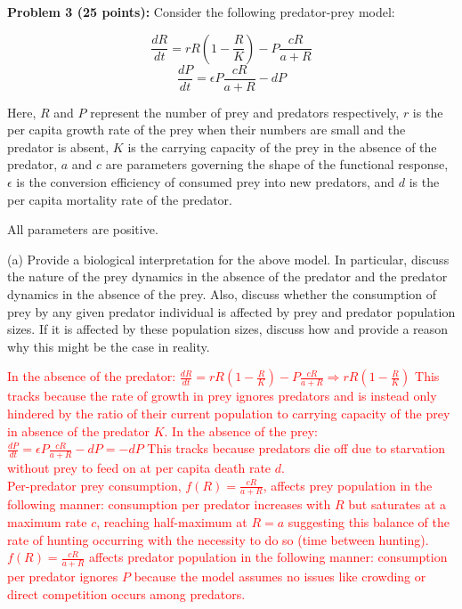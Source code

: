 \documentclass[11pt]{article}
\begin{document}
{\bf Problem 3 (25 points):}
Consider the following predator-prey model: 

\[\frac{dR}{dt} = rR(1-\frac{R}{K})-P \frac{cR}{a+R}\]
\[\frac{dP}{dt} = \epsilon P \frac{cR}{a+R} -dP\]


Here, $R$ and $P$ represent the number of prey and predators respectively, $r$ is the per capita growth rate of the prey when their numbers are small and the predator is absent, $K$ is the carrying capacity of the prey in the absence of the predator, $a$ and $c$ are parameters governing the shape of the functional response, $\epsilon$ is the conversion efficiency of consumed prey into new predators, and $d$ is the per capita mortality rate of the predator. 

All parameters are positive.

(a) Provide a biological interpretation for the above model. In particular, discuss the nature of the prey dynamics in the absence of the predator and the predator dynamics in the absence of the prey. Also, discuss whether the consumption of prey by any given predator individual is affected by prey and predator population sizes. If it is affected by these population sizes, discuss how and provide a reason why this might be the case in reality. 

\textcolor{red}{
In the absence of the predator: $\frac{dR}{dt} = rR(1-\frac{R}{K})-P \frac{cR}{a+R} \Rightarrow rR(1-\frac{R}{K})$ This tracks because the rate of growth in prey ignores predators and is instead only hindered by the ratio of their current population to carrying capacity of the prey in absence of the predator $K$.
In the absence of the prey: $\frac{dP}{dt} = \epsilon P \frac{cR}{a+R} -dP = -dP$ This tracks because predators die off due to starvation without prey to feed on at per capita death rate $d$.\\
Per-predator prey consumption, $f(R) = \frac{cR}{a+R}$, affects prey population in the following manner: consumption per predator increases with $R$ but saturates at a maximum rate $c$, reaching half-maximum at $R = a$ suggesting this balance of the rate of hunting occurring with the necessity to do so (time between hunting).\\
$f(R) = \frac{cR}{a+R}$ affects predator population in the following manner: consumption per predator ignores $P$ because the model assumes no issues like crowding or direct competition occurs among predators.
}
\end{document}
